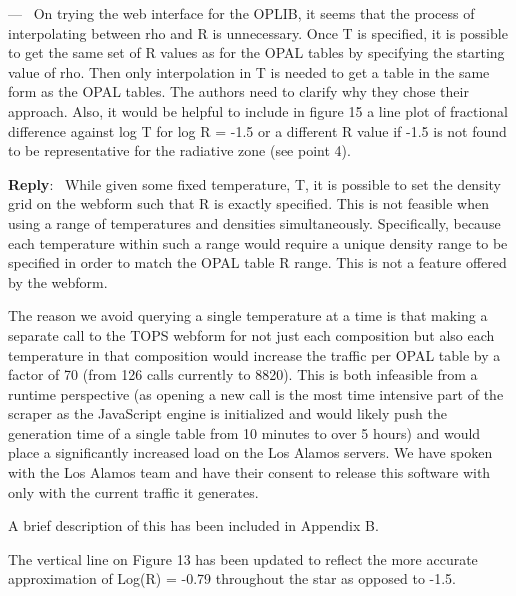\documentclass[11pt]{article}
\newcounter{reviewer}
\newcounter{point}[reviewer]
\renewcommand{\thepoint}{\arabic{point})}
\newenvironment{point}
   {\refstepcounter{point} \bigskip \noindent {\textbf{Referee~Point~\thepoint} } ---\ }
   {\par }
\newenvironment{reply}
   {\medskip \noindent \begin{sf}\textbf{Reply}:\  }
   {\medskip \end{sf}}
\begin{document}
\begin{point}
	On trying the web interface for the OPLIB, it seems that the process of
	interpolating between rho and R is unnecessary. Once T is specified, it is
	possible to get the same set of R values as for the OPAL tables by
	specifying the starting value of rho. Then only interpolation in T is
	needed to get a table in the same form as the OPAL tables. The authors need
	to clarify why they chose their approach. Also, it would be helpful to
	include in figure 15 a line plot of fractional difference against log T for
	log R = -1.5 or a different R value if -1.5 is not found to be
	representative for the radiative zone (see point 4). \label{pt:webR}
\end{point}

\begin{reply}
	While given some fixed temperature, T, it is possible to set the density
	grid on the webform such that R is exactly specified. This is not feasible
	when using a range of temperatures and densities simultaneously.
	Specifically, because each temperature within such a range would require a
	unique density range to be specified in order to match the OPAL table R
	range. This is not a feature offered by the webform.

	The reason we avoid querying a single temperature at a time is that making
	a separate call to the TOPS webform for not just each composition but also
	each temperature in that composition would increase the traffic per OPAL
	table by a factor of 70 (from 126 calls currently to 8820). This is both
	infeasible from a runtime perspective (as opening a new call is the most
	time intensive part of the scraper as the JavaScript engine is initialized
	and would likely push the generation time of a single table from 10
	minutes to over 5 hours) and would place a significantly increased load on
	the Los Alamos servers. We have spoken with the Los Alamos team and have
	their consent to release this software with only with the current traffic
	it generates. 

	A brief description of this has been included in Appendix B.

	The vertical line on Figure 13 has been updated to reflect the more accurate 
	approximation of Log(R) = -0.79 throughout the star as opposed to -1.5.
\end{reply}
\end{document}
